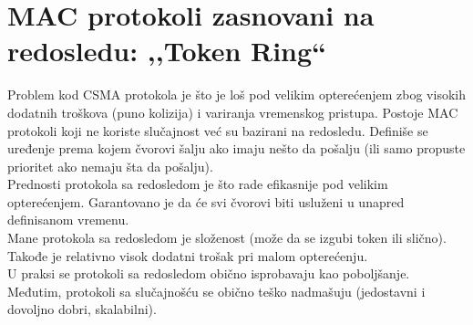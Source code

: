 \documentclass[a4paper]{article}
\begin{document}
\section{MAC protokoli zasnovani na redosledu: ,,Token Ring``}
    Problem kod CSMA protokola je što je loš pod velikim opterećenjem
    zbog visokih dodatnih troškova (puno kolizija) i variranja vremenskog pristupa. 
    Postoje MAC protokoli koji ne koriste slučajnost već su bazirani na redosledu. Definiše
    se uređenje prema kojem čvorovi šalju ako imaju nešto da pošalju (ili samo propuste prioritet ako
    nemaju šta da pošalju). \\
    \indent Prednosti protokola sa redosledom je što rade efikasnije pod velikim opterećenjem.
    Garantovano je da će svi čvorovi biti usluženi u unapred definisanom vremenu. \\
    \indent Mane protokola sa redosledom je složenost (može da se izgubi token ili slično). Takođe je
    relativno visok dodatni trošak pri malom opterećenju. \\
    \indent U praksi se protokoli sa redosledom obično isprobavaju kao poboljšanje. Međutim, protokoli
    sa slučajnošću se obično teško nadmašuju (jedostavni i dovoljno dobri, skalabilni). 
\end{document}
